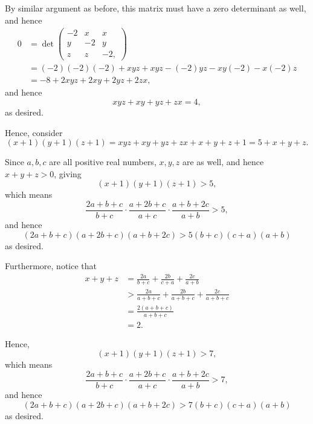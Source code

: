 \begin{enumerate}
          By similar argument as before, this matrix must have a zero determinant as well, and hence
          \begin{align*}
              0 & = \det \begin{pmatrix}
                             -2 & x  & x   \\
                             y  & -2 & y   \\
                             z  & z  & -2,
                         \end{pmatrix}                                             \\
                & = (-2) (-2) (-2) + x y z + x y z - (-2) y z - x y (-2) - x (-2) z \\
                & = -8 + 2xyz + 2xy + 2yz + 2zx,
          \end{align*}
          and hence
          \[
              xyz + xy + yz + zx = 4,
          \]
          as desired.

          Hence, consider
          \[
              (x + 1) (y + 1) (z + 1) = xyz + xy + yz + zx + x + y + z + 1 = 5 + x + y + z.
          \]

          Since \(a, b, c\) are all positive real numbers, \(x, y, z\) are as well, and hence \(x + y + z > 0\), giving
          \[
              (x + 1) (y + 1) (z + 1) > 5,
          \]
          which means
          \[
              \frac{2a + b + c}{b + c} \cdot \frac{a + 2b + c}{a + c} \cdot \frac{a + b + 2c}{a + b} > 5,
          \]
          and hence
          \[
              (2a + b + c) (a + 2b + c) (a + b + 2c) > 5 (b + c) (c + a) (a + b)
          \]
          as desired.

          Furthermore, notice that
          \begin{align*}
              x + y + z & = \frac{2a}{b + c} + \frac{2b}{c + a} + \frac{2c}{a + b}             \\
                        & > \frac{2a}{a + b + c} + \frac{2b}{a + b + c} + \frac{2c}{a + b + c} \\
                        & = \frac{2(a + b + c)}{a + b + c}                                     \\
                        & = 2.
          \end{align*}

          Hence,
          \[
              (x + 1) (y + 1) (z + 1) > 7,
          \]
          which means
          \[
              \frac{2a + b + c}{b + c} \cdot \frac{a + 2b + c}{a + c} \cdot \frac{a + b + 2c}{a + b} > 7,
          \]
          and hence
          \[
              (2a + b + c) (a + 2b + c) (a + b + 2c) > 7 (b + c) (c + a) (a + b)
          \]
          as desired.
\end{enumerate}
